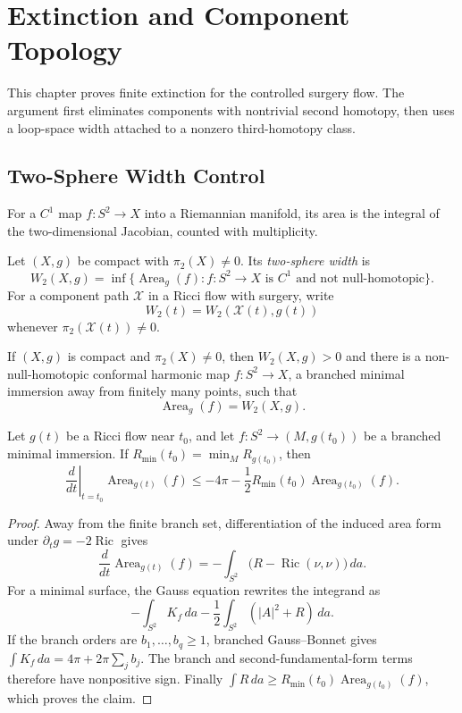 \chapter{Extinction and Component Topology}

This chapter proves finite extinction for the controlled surgery flow.  The
argument first eliminates components with nontrivial second homotopy, then
uses a loop-space width attached to a nonzero third-homotopy class.

\section{Two-Sphere Width Control}

For a $C^1$ map $f\colon S^2\to X$ into a Riemannian manifold, its area is
the integral of the two-dimensional Jacobian, counted with multiplicity.

\begin{definition}
\label{def:two-sphere-width}
\notready
Let $(X,g)$ be compact with $\pi_2(X)\ne0$.  Its \emph{two-sphere width} is
\[
 W_2(X,g)=\inf\{\operatorname{Area}_g(f):f\colon S^2\to X\text{ is $C^1$ and not
 null-homotopic}\}.
\]
For a component path $\mathcal X$ in a Ricci flow with surgery, write
\[
 W_2(t)=W_2(\mathcal X(t),g(t))
\]
whenever
$\pi_2(\mathcal X(t))\ne0$.
\end{definition}

\begin{theorem}
\label{thm:two-sphere-width-realization}
\notready
If $(X,g)$ is compact and $\pi_2(X)\ne0$, then $W_2(X,g)>0$ and there is a
non-null-homotopic conformal harmonic map $f\colon S^2\to X$, a branched
minimal immersion away from finitely many points, such that
\[
 \operatorname{Area}_g(f)=W_2(X,g).
\]
\end{theorem}

\begin{lemma}
\label{lem:minimal-two-sphere-area-variation}
\notready
Let $g(t)$ be a Ricci flow near $t_0$, and let
$f\colon S^2\to(M,g(t_0))$ be a branched minimal immersion.  If
$R_{\min}(t_0)=\min_M R_{g(t_0)}$, then
\[
 \left.\frac d{dt}\right|_{t=t_0}\operatorname{Area}_{g(t)}(f)
 \le -4\pi-\frac12R_{\min}(t_0)\operatorname{Area}_{g(t_0)}(f).
\]
\end{lemma}

\begin{proof}
Away from the finite branch set, differentiation of the induced area form
under $\partial_tg=-2\operatorname{Ric}$ gives
\[
 \frac d{dt}\operatorname{Area}_{g(t)}(f)
 =-\int_{S^2}\bigl(R-\operatorname{Ric}(\nu,\nu)\bigr)\,da.
\]
For a minimal surface, the Gauss equation rewrites the integrand as
\[
 -\int_{S^2}K_f\,da-
 \frac12\int_{S^2}(|A|^2+R)\,da.
\]
If the branch orders are $b_1,\ldots,b_q\ge1$, branched Gauss--Bonnet gives
$\int K_f\,da=4\pi+2\pi\sum_jb_j$.  The branch and second-fundamental-form
terms therefore have nonpositive sign.  Finally
$\int R\,da\ge R_{\min}(t_0)\operatorname{Area}_{g(t_0)}(f)$, which proves the claim.
\end{proof}

